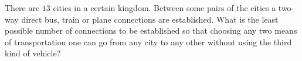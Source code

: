 There are $13$ cities in a certain kingdom. Between some pairs of the cities a two-way direct bus, train or plane connections are established. What is the least possible number of connections to be established so that choosing any two means of transportation one can go from any city to any other without using the third kind of vehicle?